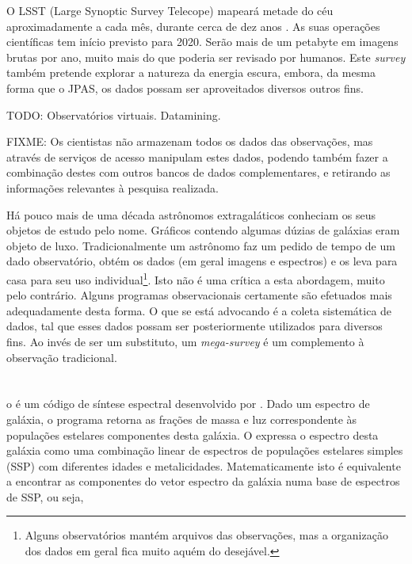 O LSST (Large Synoptic Survey Telecope) mapeará metade do céu aproximadamente a
cada mês, durante cerca de dez anos \citep{Ivezic2008}. As suas operações
científicas tem início previsto para 2020. Serão mais de um petabyte em imagens
brutas por ano, muito mais do que poderia ser revisado por humanos. Este {\em
survey} também pretende explorar a natureza da energia escura, embora, da mesma
forma que o JPAS, os dados possam ser aproveitados diversos outros fins.

TODO: Observatórios virtuais. Datamining.

FIXME: Os cientistas não armazenam todos os dados das observações, mas através
de serviços de acesso manipulam estes dados, podendo também fazer a combinação
destes com outros bancos de dados complementares, e retirando as informações
relevantes à pesquisa realizada.

Há pouco mais de uma década astrônomos extragaláticos conheciam os seus objetos
de estudo pelo nome. Gráficos contendo algumas dúzias de galáxias eram objeto de
luxo. Tradicionalmente um astrônomo faz um pedido de tempo de um dado
observatório, obtém os dados (em geral imagens e espectros) e os leva para casa
para seu uso individual\footnote{Alguns observatórios mantém arquivos das
observações\citneed, mas a organização dos dados em geral fica muito aquém do
desejável.}. Isto não é uma crítica a esta abordagem, muito pelo contrário.
Alguns programas observacionais certamente são efetuados mais adequadamente
desta forma. O que se está advocando é a coleta sistemática de dados, tal que
esses dados possam ser posteriormente utilizados para diversos fins. Ao invés de
ser um substituto, um {\em mega-survey} é um complemento à observação
tradicional.



\section{\starlight}
\label{sec:Intro:Starlight}

o \starlight é um código de síntese espectral desenvolvido por
\citet{CidFernandes2005}. Dado um espectro de galáxia, o programa retorna as
frações de massa e luz correspondente às populações estelares componentes desta
galáxia. O \starlight expressa o espectro desta galáxia como uma combinação
linear de espectros de populações estelares simples (SSP) com diferentes idades
e metalicidades. Matematicamente isto é equivalente a encontrar as componentes
do vetor espectro da galáxia numa base de espectros de SSP, ou seja,

